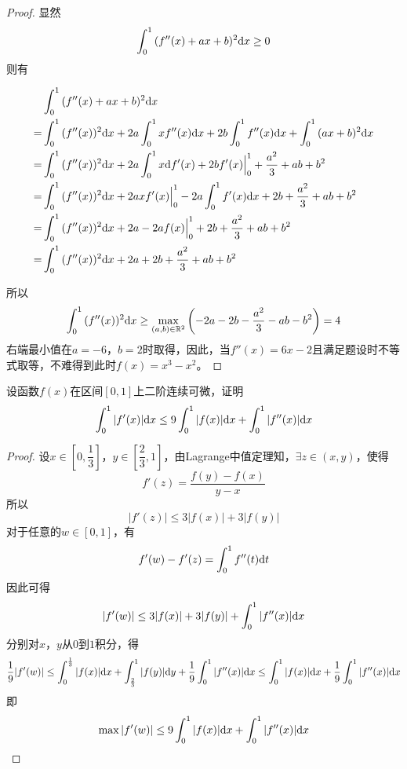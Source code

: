\begin{proof}

    显然
    $$\int_{0}^{1}{(f''(x) + ax + b)^2}\mathrm{d} x \geq 0$$
    则有

    \begin{align*}
        & \int_{0}^{1}{(f''(x) + ax + b)^2}\mathrm{d} x \\
        = & \int_{0}^{1}{(f''(x))^2}\mathrm{d} x + 2a \int_{0}^{1}{xf''(x)}\mathrm{d} x + 2b \int_{0}^{1}{f''(x)}\mathrm{d} x + \int_{0}^{1}{(ax + b)^2}\mathrm{d} x \\
        = & \int_{0}^{1}{(f''(x))^2}\mathrm{d} x + 2a \int_{0}^{1}{x}\mathrm{d} f'(x) + 2b f'(x) \Big|_{0}^{1} + \dfrac{a^2}{3} + ab + b^2 \\
        = & \int_{0}^{1}{(f''(x))^2}\mathrm{d} x + 2a xf'(x)\Big|_{0}^{1} - 2a \int_{0}^{1}{f'(x)}\mathrm{d} x + 2b + \dfrac{a^2}{3} + ab + b^2 \\
        = & \int_{0}^{1}{(f''(x))^2}\mathrm{d} x + 2a - 2af(x)\Big|_{0}^{1} + 2b + \dfrac{a^2}{3} + ab + b^2 \\
        = & \int_{0}^{1}{(f''(x))^2}\mathrm{d} x + 2a + 2b + \dfrac{a^2}{3} + ab + b^2
    \end{align*}

    所以
    $$\int_{0}^{1}{(f''(x))^2}\mathrm{d} x \geq \max_{(a,b) \in \mathbb{R}^2}\left(-2a - 2b - \dfrac{a^2}{3} - ab - b^2 \right) = 4$$
    右端最小值在$a = -6$，$b = 2$时取得，因此，当$f''(x) = 6x - 2$且满足题设时不等式取等，不难得到此时$f(x) = x^3 - x^2$。
    
\end{proof}

\begin{proposition}

    设函数$f(x)$在区间$[0,1]$上二阶连续可微，证明
    $$\int_{0}^{1}{|f'(x)|}\mathrm{d} x \leq 9\int_{0}^{1}{|f(x)|}\mathrm{d} x + \int_{0}^{1}{|f''(x)|}\mathrm{d} x$$

\end{proposition}

\begin{proof}

    设$x \in \left[0, \dfrac{1}{3}\right]$，$y \in \left[\dfrac{2}{3}, 1\right]$，由\textup{Lagrange}中值定理知，$\exists z \in (x,y)$，使得
    $$f'(z) = \dfrac{f(y) - f(x)}{y - x}$$
    所以
    $$|f'(z)| \leq 3|f(x)| + 3|f(y)|$$
    对于任意的$w \in [0,1]$，有
    $$f'(w) - f'(z) = \int_{0}^{1}{f''(t)}\mathrm{d} t$$
    因此可得
    $$|f'(w)| \leq 3|f(x)| + 3|f(y)| + \int_{0}^{1}{|f''(x)|}\mathrm{d} x$$
    分别对$x$，$y$从$0$到$1$积分，得
    $$\dfrac{1}{9} |f'(w)| \leq \int_{0}^{\frac{1}{3}}{|f(x)|}\mathrm{d} x + \int_{\frac{2}{3}}^{1}{|f(y)|}\mathrm{d} y + \dfrac{1}{9} \int_{0}^{1}{|f''(x)|}\mathrm{d} x \leq \int_{0}^{1}{|f(x)|}\mathrm{d} x + \dfrac{1}{9}\int_{0}^{1}{|f''(x)|}\mathrm{d} x$$
    即
    $$\max{|f'(w)|} \leq 9\int_{0}^{1}{|f(x)|}\mathrm{d} x + \int_{0}^{1}{|f''(x)|}\mathrm{d} x$$
    
\end{proof}


